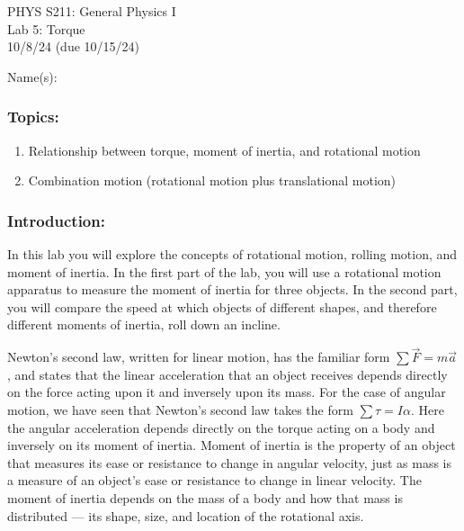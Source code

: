 \documentclass[11pt,letterpaper]{article}
\begin{document}
\setlength{\parindent}{0in}


\begin{flushright}
PHYS S211: General Physics I\\
Lab 5: Torque\\
10/8/24 (due 10/15/24)
\end{flushright}

Name(s):\\

\subsubsection*{Topics:}
\begin{enumerate}
\setlength{\parskip}{3pt}
\item Relationship between torque, moment of inertia, and rotational motion
\item Combination motion (rotational motion plus translational motion)
\end{enumerate}

\subsubsection*{Introduction:}
In this lab you will explore the concepts of rotational motion, rolling motion, and moment of inertia. In the first part of the lab, you will use a rotational motion apparatus to measure the moment of inertia for three objects. In the second part, you will compare the speed at which objects of different shapes, and therefore different moments of inertia, roll down an incline.  
 
Newton's second law, written for linear motion, has the familiar form $\sum \vec F=m\vec a$, and states that the linear acceleration that an object receives depends directly on the force acting upon it
and inversely upon its mass.  For the case of angular motion, we have seen that Newton's
second law takes the form $\sum\tau = I \alpha$. Here the angular acceleration depends directly on the torque acting on a body and inversely on its moment of inertia.  Moment of inertia is the
property of an object that measures its ease or resistance to change in angular velocity, just as mass is a measure of an object's ease or resistance to change in linear velocity. The moment of inertia depends on the mass of a body and how that mass is distributed --- its shape, size, and location of the rotational axis.
\end{document}
